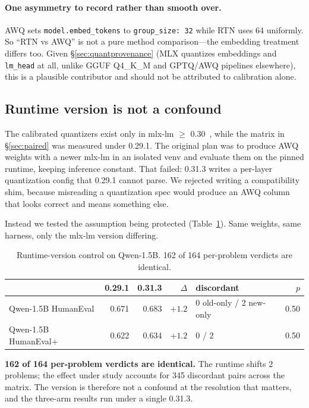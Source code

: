 \documentclass[11pt]{article}
\begin{document}
\paragraph{One asymmetry to record rather than smooth over.} AWQ sets
\texttt{model.embed\_tokens} to \texttt{group\_size:~32} while RTN uses 64 uniformly. So
``RTN vs AWQ'' is not a pure method comparison---the embedding treatment differs too.
Given \S\ref{sec:quantprovenance} (MLX quantizes embeddings and \texttt{lm\_head} at all,
unlike GGUF Q4\_K\_M and GPTQ/AWQ pipelines elsewhere), this is a plausible contributor
and should not be attributed to calibration alone.

\subsection{Runtime version is not a confound}
\label{sec:runtime}

The calibrated quantizers exist only in mlx-lm $\geq$ 0.30~\citep{applelearnedquants},
while the matrix in \S\ref{sec:paired} was measured under 0.29.1. The original plan was
to produce AWQ weights with a newer mlx-lm in an isolated venv and evaluate them on the
pinned runtime, keeping inference constant. That failed: 0.31.3 writes a per-layer
quantization config that 0.29.1 cannot parse. We rejected writing a compatibility shim,
because misreading a quantization spec would produce an AWQ column that looks correct and
means something else.

Instead we tested the assumption being protected (Table~\ref{tab:runtime}). Same weights,
same harness, only the mlx-lm version differing.

\begin{table}[h]
  \centering
  \caption{Runtime-version control on Qwen-1.5B. 162 of 164 per-problem verdicts are
    identical.}
  \label{tab:runtime}
  \smallskip
  \begin{tabular}{lrrrlr}
    \toprule
    & 0.29.1 & 0.31.3 & $\Delta$ & discordant & $p$ \\
    \midrule
    Qwen-1.5B HumanEval  & 0.671 & 0.683 & $+1.2$ & 0 old-only / 2 new-only & 0.50 \\
    Qwen-1.5B HumanEval+ & 0.622 & 0.634 & $+1.2$ & 0 / 2 & 0.50 \\
    \bottomrule
  \end{tabular}
\end{table}

\textbf{162 of 164 per-problem verdicts are identical.} The runtime shifts 2 problems;
the effect under study accounts for 345 discordant pairs across the matrix. The version
is therefore not a confound at the resolution that matters, and the three-arm results run
under a single 0.31.3.
\end{document}
